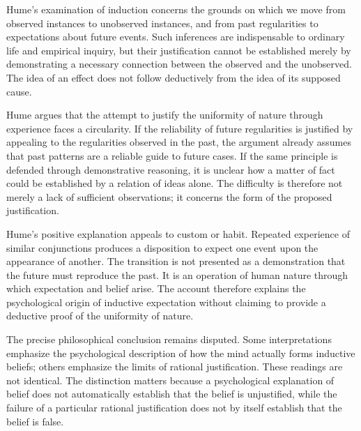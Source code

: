 \label{para:VS.B01.P01.C08.S09.SS04.P001}

Hume's examination of induction concerns the grounds
on which we move from observed instances to unobserved
instances, and from past regularities to expectations
about future events. Such inferences are indispensable
to ordinary life and empirical inquiry, but their
justification cannot be established merely by
demonstrating a necessary connection between the
observed and the unobserved. The idea of an effect
does not follow deductively from the idea of its
supposed cause.
\cite[1.3.6.1--4, SBN 86--89]{HumeTreatise}

\label{para:VS.B01.P01.C08.S09.SS04.P002}

Hume argues that the attempt to justify the uniformity
of nature through experience faces a circularity.
If the reliability of future regularities is justified
by appealing to the regularities observed in the past,
the argument already assumes that past patterns are
a reliable guide to future cases. If the same principle
is defended through demonstrative reasoning, it is
unclear how a matter of fact could be established
by a relation of ideas alone. The difficulty is
therefore not merely a lack of sufficient observations;
it concerns the form of the proposed justification.
\cite[4.2--4.23, SBN 26--35]{HumeEnquiry}

\label{para:VS.B01.P01.C08.S09.SS04.P003}

Hume's positive explanation appeals to custom or habit.
Repeated experience of similar conjunctions produces
a disposition to expect one event upon the appearance
of another. The transition is not presented as a
demonstration that the future must reproduce the past.
It is an operation of human nature through which
expectation and belief arise. The account therefore
explains the psychological origin of inductive
expectation without claiming to provide a deductive
proof of the uniformity of nature.
\cite[5.1--5.22, SBN 39--55]{HumeEnquiry}

\label{para:VS.B01.P01.C08.S09.SS04.P004}

The precise philosophical conclusion remains disputed.
Some interpretations emphasize the psychological
description of how the mind actually forms inductive
beliefs; others emphasize the limits of rational
justification. These readings are not identical.
The distinction matters because a psychological
explanation of belief does not automatically establish
that the belief is unjustified, while the failure
of a particular rational justification does not
by itself establish that the belief is false.
\cite[4.2--5.22]{HumeEnquiry}
\cite{Millican1995,QuRadcliffeHume2026}


